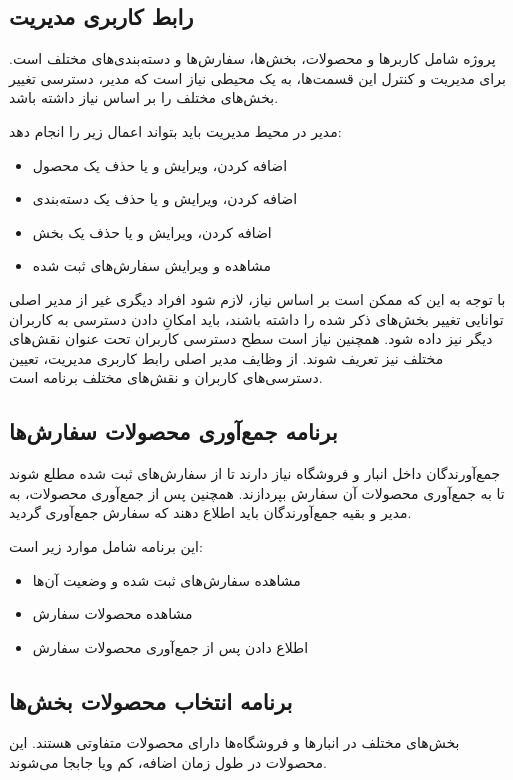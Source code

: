 \subsection{رابط کاربری مدیریت}
پروژه شامل کاربرها و محصولات، بخش‌ها، سفارش‌ها و دسته‌بندی‌های مختلف است. برای مدیریت و کنترل این قسمت‌ها، به یک محیطی نیاز است که مدیر، دسترسی تغییر بخش‌های مختلف را بر اساس نیاز داشته باشد.

مدیر در محیط مدیریت باید بتواند اعمال زیر را انجام دهد:
\begin{itemize}
   	\item اضافه کردن، ویرایش و یا حذف یک محصول
   	\item اضافه کردن، ویرایش و یا حذف یک دسته‌بندی
   	\item اضافه کردن، ویرایش و یا حذف یک بخش
   	\item مشاهده و ویرایش سفارش‌های ثبت شده
\end{itemize}
با توجه به این که ممکن است بر اساس نیاز، لازم شود افراد دیگری غیر از مدیر اصلی توانایی تغییر بخش‌های ذکر شده را داشته باشند، باید امکانِ دادن دسترسی به کاربران دیگر نیز داده شود. همچنین نیاز است سطح دسترسی کاربران تحت عنوان نقش‌های مختلف نیز تعریف شوند. از وظایف مدیر اصلی رابط کاربری مدیریت، تعیین دسترسی‌های کاربران و نقش‌های مختلف برنامه است.

\subsection{برنامه جمع‌آوری محصولات سفارش‌ها}
جمع‌آورندگان داخل انبار و فروشگاه نیاز دارند تا از سفارش‌های ثبت شده مطلع شوند تا به جمع‌آوری محصولات آن سفارش بپردازند. همچنین پس از جمع‌آوری محصولات، به مدیر و بقیه جمع‌آورندگان باید اطلاع دهند که سفارش جمع‌آوری گردید.

این برنامه شامل موارد زیر است:
\begin{itemize}
	\item مشاهده سفارش‌های ثبت شده و وضعیت آن‌ها
	\item مشاهده محصولات سفارش
	\item اطلاع‌ دادن پس از جمع‌آوری محصولات سفارش
\end{itemize}

\subsection{برنامه انتخاب محصولات بخش‌ها‌}
بخش‌های مختلف در انبارها و فروشگاه‌ها دارای محصولات متفاوتی هستند. این محصولات در طول زمان اضافه، کم ویا جابجا می‌شوند.

